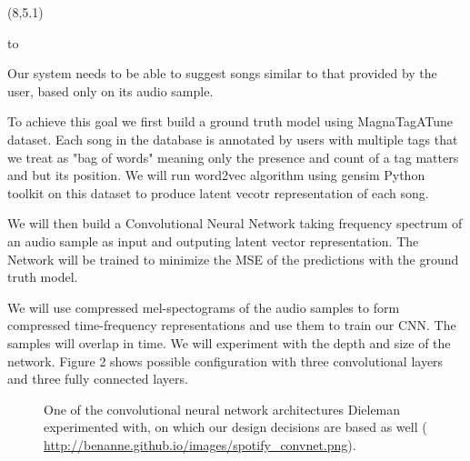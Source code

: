 \documentclass[a0]{a0poster}
\def\Head#1{
  \noindent\hbox to \hsize{\hfil{\LARGE\color{DarkBlue}\sf #1}}\bigskip}
\def\Subhead#1{\noindent{\large\color{DarkBlue}\sf #1}\bigskip}
\begin{document}
  \begin{textblock}{7}(8,5.1)
    \Head{Architecture}
    \sf

    \Subhead{Overview}

    Our system needs to be able to suggest songs similar to that provided by
    the user, based only on its audio sample.

    To achieve this goal we first build a ground truth model using 
    MagnaTagATune dataset. Each song in the database is annotated by users with
    multiple tags that we treat as "bag of words" meaning only the presence and
    count of a tag matters and but its position. We will run word2vec algorithm
    using gensim Python toolkit on this dataset to produce latent vecotr
    representation of each song.

    We will then build a Convolutional Neural Network taking frequency spectrum
    of an audio sample as input and outputing latent vector representation. The
    Network will be trained to minimize the MSE of the predictions with the
    ground truth model.

    \bigskip

    \Subhead{Details}

    We will use compressed mel-spectograms of the audio samples to form
    compressed time-frequency representations and use them to train our CNN.
    The samples will overlap in time. We will experiment with the depth and
    size of the network. Figure 2 shows possible configuration with three
    convolutional layers and three fully connected layers.

    \hspace*{1cm}
    \begin{figure}
      \centering
      \caption{One of the convolutional neural network architectures Dieleman
        experimented with, on which our design decisions are based as well
        (\url{ http://benanne.github.io/images/spotify\_convnet.png}).}
    \end{figure}

    \bigskip

  \end{textblock}
\end{document}
